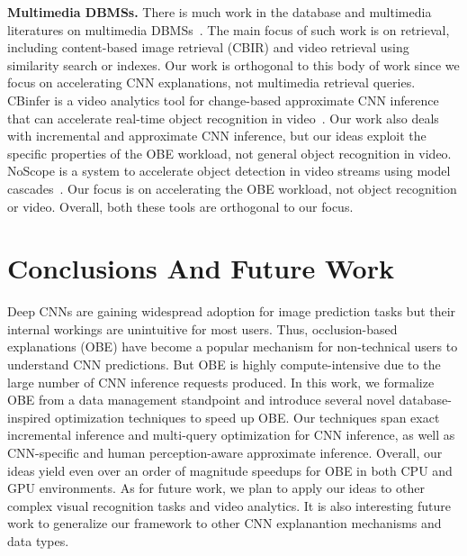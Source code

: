 \documentclass[10pt, sigconf]{acmart}
\begin{document}
\vspace{2mm}
\noindent \textbf{Multimedia DBMSs.} 
There is much work in the database and multimedia literatures on multimedia DBMSs~\cite{adjeroh1997multimedia,kalipsiz2000multimedia}. The main focus of such work is on retrieval, including content-based image retrieval (CBIR) and video retrieval using similarity search or indexes. Our work is orthogonal to this body of work since we focus on accelerating CNN explanations, not multimedia retrieval queries. CBinfer is a video analytics tool for change-based approximate CNN inference that can accelerate real-time object recognition in video~\cite{cavigelli2017cbinfer}. Our work also deals with incremental and approximate CNN inference, but our ideas exploit the specific properties of the OBE workload, not general object recognition in video. NoScope is a system to accelerate object detection in video streams using model cascades~\cite{kang2017noscope}. Our focus is on accelerating the OBE workload, not object recognition or video. Overall, both these tools are orthogonal to our focus.

\section{Conclusions And Future Work}
Deep CNNs are gaining widespread adoption for image prediction tasks but their internal workings are unintuitive for most users. Thus, occlusion-based explanations (OBE) have become a popular mechanism for non-technical users to understand CNN predictions. But OBE is highly compute-intensive due to the large number of CNN inference requests produced. In this work, we formalize OBE from a data management standpoint and introduce several novel database-inspired optimization techniques to speed up OBE. Our techniques span exact incremental inference and multi-query optimization for CNN inference, as well as CNN-specific and human perception-aware approximate inference. Overall, our ideas yield even over an order of magnitude speedups for OBE in both CPU and GPU environments. As for future work, we plan to apply our ideas to other complex visual recognition tasks and video analytics. It is also interesting future work to generalize our framework to other CNN explanantion mechanisms and data types.

\pagebreak






\end{document}
